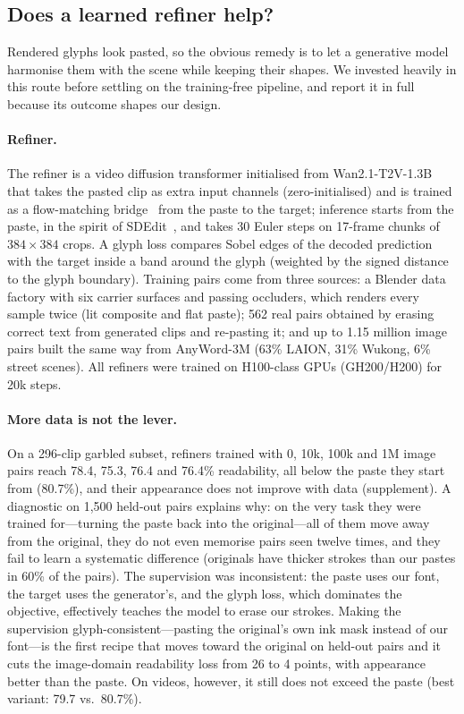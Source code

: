 \subsection{Does a learned refiner help?}
\label{sec:exp_refiner}


Rendered glyphs look pasted, so the obvious remedy is to let a generative model harmonise them with the scene while keeping their shapes. We invested heavily in this route before settling on the training-free pipeline, and report it in full because its outcome shapes our design.

\paragraph{Refiner.} The refiner is a video diffusion transformer initialised from Wan2.1-T2V-1.3B~\cite{wan2025wan} that takes the pasted clip as extra input channels (zero-initialised) and is trained as a flow-matching bridge~\cite{lipman2023flowmatching,liu2023rectifiedflow} from the paste to the target; inference starts from the paste, in the spirit of SDEdit~\cite{meng2022sdedit}, and takes 30 Euler steps on 17-frame chunks of $384\times384$ crops. A glyph loss compares Sobel edges of the decoded prediction with the target inside a band around the glyph (weighted by the signed distance to the glyph boundary). Training pairs come from three sources: a Blender data factory with six carrier surfaces and passing occluders, which renders every sample twice (lit composite and flat paste); 562 real pairs obtained by erasing correct text from generated clips and re-pasting it; and up to 1.15 million image pairs built the same way from AnyWord-3M (63\% LAION, 31\% Wukong, 6\% street scenes). All refiners were trained on H100-class GPUs (GH200/H200) for 20k steps.

\paragraph{More data is not the lever.} On a 296-clip garbled subset, refiners trained with 0, 10k, 100k and 1M image pairs reach 78.4, 75.3, 76.4 and 76.4\% readability, all below the paste they start from (80.7\%), and their appearance does not improve with data (supplement). A diagnostic on 1{,}500 held-out pairs explains why: on the very task they were trained for---turning the paste back into the original---all of them move away from the original, they do not even memorise pairs seen twelve times, and they fail to learn a systematic difference (originals have thicker strokes than our pastes in 60\% of the pairs). The supervision was inconsistent: the paste uses our font, the target uses the generator's, and the glyph loss, which dominates the objective, effectively teaches the model to erase our strokes. Making the supervision glyph-consistent---pasting the original's own ink mask instead of our font---is the first recipe that moves toward the original on held-out pairs and it cuts the image-domain readability loss from 26 to 4 points, with appearance better than the paste. On videos, however, it still does not exceed the paste (best variant: 79.7 vs.\ 80.7\%).

